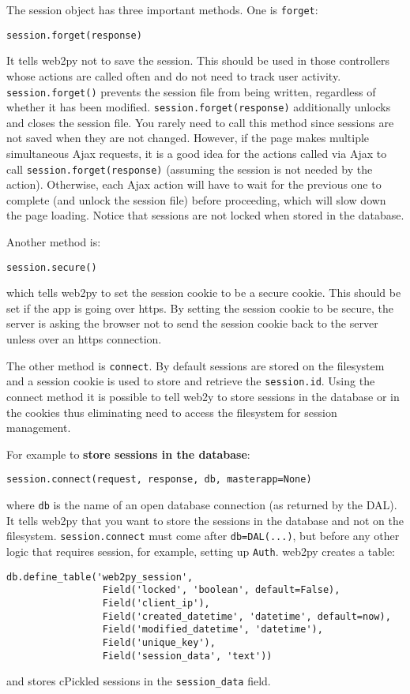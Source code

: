\documentclass[justified,sixbynine,notoc]{tufte-book}
\def\ft{\small\tt}
\begin{document}
\begin{fullwidth}
The session object has three important methods. One is {\ft forget}:
\begin{lstlisting}
session.forget(response)
\end{lstlisting}

It tells web2py not to save the session. This should be used in those controllers whose actions are called often and do not need to track user activity. {\ft session.forget()} prevents the session file from being written, regardless of whether it has been modified. {\ft session.forget(response)} additionally unlocks and closes the session file. You rarely need to call this method since sessions are not saved when they are not changed. However, if the page makes multiple simultaneous Ajax requests, it is a good idea for the actions called via Ajax to call {\ft session.forget(response)} (assuming the session is not needed by the action). Otherwise, each Ajax action will have to wait for the previous one to complete (and unlock the session file) before proceeding, which will slow down the page loading. Notice that sessions are not locked when stored in the database.

Another method is:

\begin{lstlisting}
session.secure()
\end{lstlisting}
\noindent which tells web2py to set the session cookie to be a secure cookie. This should be set if the app is going over https. By setting the session cookie to be secure, the server is asking the browser not to send the session cookie back to the server unless over an https connection.

The other method is {\ft connect}.
By default sessions are stored on the filesystem and a session cookie is used to store and retrieve the {\ft session.id}. Using the connect method it is possible to tell web2y to store sessions in the database or in the cookies thus eliminating need to access the filesystem for session management.

For example to {\bf store sessions in the database}:

\begin{lstlisting}
session.connect(request, response, db, masterapp=None)
\end{lstlisting}
\noindent where {\ft db} is the name of an open database connection (as returned by the DAL). It tells web2py that you want to store the sessions in the database and not on the filesystem. {\ft session.connect} must come after {\ft db=DAL(...)}, but before any other logic that requires session, for example, setting up {\ft Auth}.
\noindent web2py creates a table:
\begin{lstlisting}
db.define_table('web2py_session',
                 Field('locked', 'boolean', default=False),
                 Field('client_ip'),
                 Field('created_datetime', 'datetime', default=now),
                 Field('modified_datetime', 'datetime'),
                 Field('unique_key'),
                 Field('session_data', 'text'))
\end{lstlisting}
\noindent and stores cPickled sessions in the {\ft session\_data} field.


\end{fullwidth}
\end{document}
